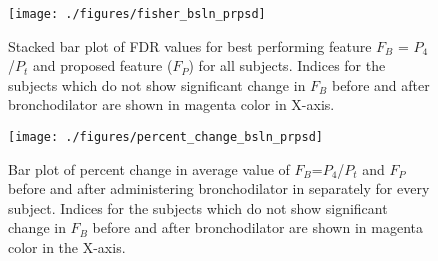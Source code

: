 \documentclass{article}
\begin{document}


%
%


	
\begin{figure}[h!]
		\centering
		\texttt{[image: ./figures/fisher\_bsln\_prpsd]}
		\caption{Stacked bar plot of FDR values for best performing feature $F_B$ = $P_{4}$/$P_{t}$ and proposed feature ($F_P$) for all subjects. Indices for the subjects which do not show significant change in $F_{B}$ before and after bronchodilator are shown in magenta color in X-axis.}
		\label{fig:fisher_bsln_prpsd}
\end{figure}
	
	\begin{figure}[h!]
		\hspace{-2cm}
		\texttt{[image: ./figures/percent\_change\_bsln\_prpsd]}
		\caption{Bar plot of percent change in average value of $F_B$=$P_{4}$/$P_{t}$ and $F_{P}$ before and after administering bronchodilator in separately for every  subject. Indices for the subjects which do not show significant change in $F_{B}$ before and after bronchodilator are shown in magenta color in the X-axis.}
		\label{fig:percent_change_bsln_prpsd}
	\end{figure}
	
\end{document}

